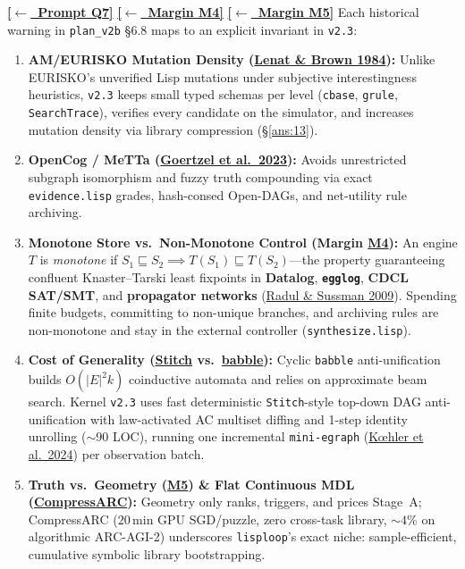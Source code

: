 \documentclass[12pt]{article}
\newcommand{\ansback}[2]{\hyperlink{#1}{\textcolor{qpurple}{\textbf{\small[\(\leftarrow\)~#2]}}}}
\newcommand{\litref}[2]{\hyperlink{lit:#1}{\textcolor{citegreen}{#2}}}
\begin{document}
\ansback{q:7}{Prompt Q7} \ansback{q:m4}{Margin M4} \ansback{q:m5}{Margin M5}
Each historical warning in \texttt{plan\_v2b} \S6.8 maps to an explicit invariant in \texttt{v2.3}:
\begin{enumerate}[leftmargin=1.6em, itemsep=0.2em]
  \item \textbf{AM/EURISKO Mutation Density (\litref{lenat1984}{Lenat \& Brown 1984}):} Unlike EURISKO's unverified Lisp mutations under subjective interestingness heuristics, \texttt{v2.3} keeps small typed schemas per level (\texttt{cbase}, \texttt{grule}, \texttt{SearchTrace}), verifies every candidate on the simulator, and increases mutation density via library compression (\S\ref{ans:13}).
  \item \textbf{OpenCog / MeTTa (\litref{goertzel2023}{Goertzel et al.\ 2023}):} Avoids unrestricted subgraph isomorphism and fuzzy truth compounding via exact \texttt{evidence.lisp} grades, hash-consed Open-DAGs, and net-utility rule archiving.
  \item \textbf{Monotone Store vs.\ Non-Monotone Control (Margin \hyperlink{q:m4}{\textbf{M4}}):} An engine $T$ is \emph{monotone} if $S_1 \sqsubseteq S_2 \implies T(S_1) \sqsubseteq T(S_2)$---the property guaranteeing confluent Knaster--Tarski least fixpoints in \textbf{Datalog}, \textbf{\texttt{egglog}}, \textbf{CDCL SAT/SMT}, and \textbf{propagator networks} (\litref{radul2009}{Radul \& Sussman 2009}). Spending finite budgets, committing to non-unique branches, and archiving rules are non-monotone and stay in the external controller (\texttt{synthesize.lisp}).
  \item \textbf{Cost of Generality (\litref{bowers2023}{Stitch} vs.\ \litref{cao2023}{babble}):} Cyclic \texttt{babble} anti-unification builds $O(|E|^2 k)$ coinductive automata and relies on approximate beam search. Kernel \texttt{v2.3} uses fast deterministic \texttt{Stitch}-style top-down DAG anti-unification with law-activated AC multiset diffing and 1-step identity unrolling ($\sim 90$ LOC), running one incremental \texttt{mini-egraph} (\litref{koehler2024}{K\oe hler et al.\ 2024}) per observation batch.
  \item \textbf{Truth vs.\ Geometry (\hyperlink{q:m5}{\textbf{M5}}) \& Flat Continuous MDL (\litref{liao2025}{CompressARC}):} Geometry only ranks, triggers, and prices Stage~A; CompressARC ($20\,\mathrm{min}$ GPU SGD/puzzle, zero cross-task library, $\sim 4\%$ on algorithmic ARC-AGI-2) underscores \texttt{lisploop}'s exact niche: sample-efficient, cumulative symbolic library bootstrapping.
\end{enumerate}
\end{document}
